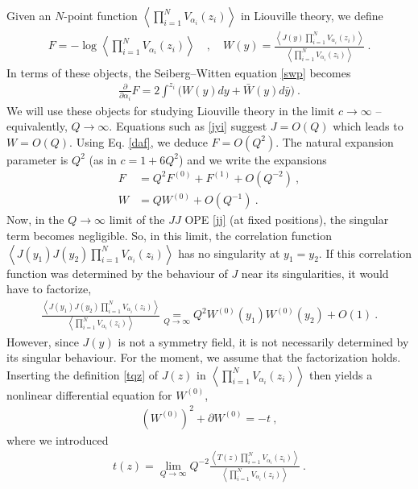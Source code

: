 \documentclass[12pt, a4paper, notitlepage, twoside]{report}
\numberwithin{equation}{section}
\theoremstyle{break}
\begin{document}
Given an $N$-point function $\left\langle \prod_{i=1}^N V_{\alpha_i}(z_i) \right\rangle$ in Liouville theory, we define
\begin{align}
 \boxed{F= -\log \left\langle \prod_{i=1}^N V_{\alpha_i}(z_i) \right\rangle} \quad , \quad \boxed{W(y) = \frac{\left\langle J(y)\prod_{i=1}^N V_{\alpha_i}(z_i) \right\rangle}{\left\langle \prod_{i=1}^N V_{\alpha_i}(z_i) \right\rangle}} \ .
 \label{fwy}
\end{align}
In terms of these objects, the Seiberg--Witten equation \eqref{swp} becomes 
\begin{align}
 {\frac{\partial}{\partial \alpha_i}} F = 2 \int^{z_i} \Big(W(y)dy+\bar W(y)d\bar y\Big)\ . 
\label{daf}
\end{align}
We will use these objects for studying Liouville theory in the limit $c\to \infty$ -- equivalently, $Q\to \infty$.
Equations such as \eqref{jyi} suggest $J=O(Q)$ which leads to $W=O(Q)$.
Using Eq. \eqref{daf}, we deduce $F=O(Q^2)$.
The natural expansion parameter is $Q^2$ (as in $c=1+6Q^2$) and we write the expansions
\begin{align}
 F &= Q^2 F^{(0)} + F^{(1)} + O(Q^{-2})\ ,
\\
W & = QW^{(0)} + O(Q^{-1})\ .
\end{align}
Now, in the $Q\to \infty$ limit of the $JJ$ OPE \eqref{jj} (at fixed positions), the singular term becomes negligible. So, in this limit, the correlation function $ \left\langle J(y_1)J(y_2)\prod_{i=1}^N V_{\alpha_i}(z_i) \right\rangle$ has no singularity at $y_1=y_2$. If this correlation function was determined by the behaviour of $J$ near its singularities, it would have to factorize,
\begin{align}
 \frac{\left\langle J(y_1)J(y_2)\prod_{i=1}^N V_{\alpha_i}(z_i)\right\rangle}{\left\langle \prod_{i=1}^N V_{\alpha_i}(z_i) \right\rangle} \underset{Q\to \infty}{=} Q^2W^{(0)}(y_1)W^{(0)}(y_2) + O(1)\ .
 \label{lqfac}
\end{align}
However, since $J(y)$ is not a symmetry field, it is not necessarily determined by its singular behaviour. For the moment, we assume that the factorization holds.
Inserting the definition \eqref{tqz} of $J(z)$ in $\left\langle \prod_{i=1}^N V_{\alpha_i}(z_i) \right\rangle$ then yields a nonlinear differential equation for $W^{(0)}$,
\begin{align}
 \boxed{\left(W^{(0)}\right)^2 + \partial W^{(0)} = - t}\ ,
\label{wwwt}
\end{align}
where we introduced
\begin{align}
 t(z) = \underset{Q\to \infty}{\lim} Q^{-2} \frac{\left\langle T(z) \prod_{i=1}^N V_{\alpha_i}(z_i) \right\rangle}{\left\langle \prod_{i=1}^N V_{\alpha_i}(z_i) \right\rangle}\ .
\end{align}
\end{document}
